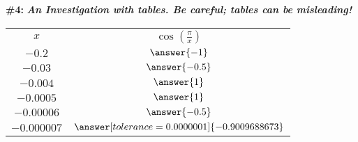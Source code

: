 \documentclass[handout,nooutcomes]{ximera}
\begin{document}
\begin{problem}{\textbf{\#4: }}{\textbf{\textit{An Investigation with tables. Be careful; tables can be misleading! }}}
\bigskip
\bigskip

\begin{tabular}{|c|c|}

\hline
		$x$ & $\cos\left(\frac{\pi}{x}\right)$\\
		
        $-0.2$ & $\answer{-1}$\\
		
		$-0.03$ & $\answer{-0.5}$\\
		
		$-0.004$ & $\answer{1}$\\
		
		$-0.0005$ & $\answer{1}$\\
		
		$-0.00006$ & $\answer{-0.5}$ \\
		
		$-0.000007$ & $\answer[tolerance=0.0000001]{-0.9009688673}$ \\

		
\end{tabular}



    
\end{problem}
\end{document}
